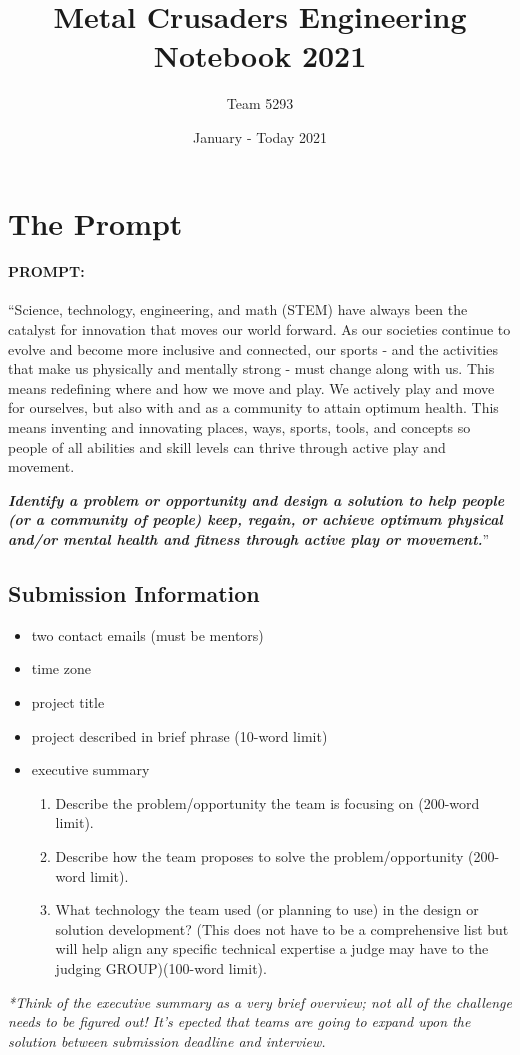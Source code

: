 \documentclass{article}
\title{\textbf{Metal Crusaders Engineering Notebook 2021}}
\author{Team 5293}
\date{January - Today 2021}
\begin{document}

\maketitle
\newpage

\tableofcontents

\newpage
\section{The Prompt}

\paragraph{PROMPT:}``Science, technology, engineering, and math (STEM) have always been the catalyst for innovation that moves our world forward. As our societies continue to evolve and become more inclusive and connected, our sports - and the activities that make us physically and mentally strong - must change along with us. This means redefining where and how we move and play. We actively play and move for ourselves, but also with and as a community to attain optimum health. This means inventing and innovating places, ways, sports, tools, and concepts so people of all abilities and skill levels can thrive through active play and movement.

\textit{\textbf{Identify a problem or opportunity and design a solution to help people (or a community of people) keep, regain, or achieve optimum physical and/or mental health and fitness through active play or movement.}}''

\subsection{Submission Information}

\begin{itemize}
  \item two contact emails (must be mentors)
  \item time zone
  \item project title
  \item project described in brief phrase (10-word limit)
  \item executive summary
  \begin{enumerate}
    \item Describe the problem/opportunity the team is focusing on (200-word limit).
    \item Describe how the team proposes to solve the problem/opportunity (200-word limit).
    \item What technology the team used (or planning to use) in the design or solution development? (This does not have to be a comprehensive list but will help align any specific technical expertise a judge may have to the judging GROUP)(100-word limit).
  \end{enumerate}
\end{itemize}
\textit{*Think of the executive summary as a very brief overview; not all of the challenge needs to be figured out! It's epected that teams are going to expand upon the solution between submission deadline and interview.}
\end{document}
